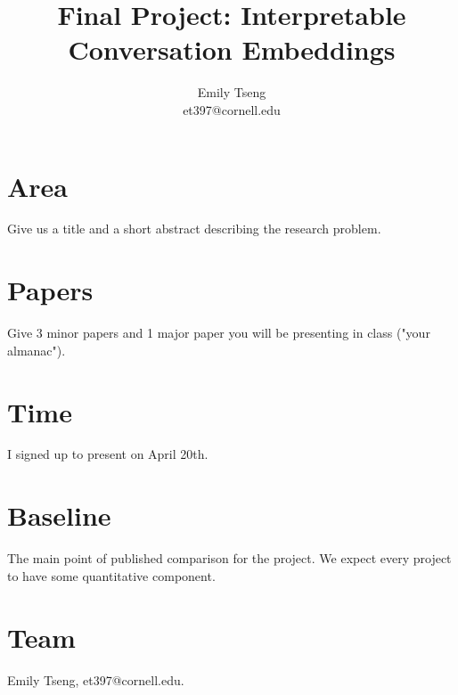 \documentclass[11pt]{article}
\title{Final Project: Interpretable Conversation Embeddings}
\author{Emily Tseng \\ et397@cornell.edu }
\begin{document}
\maketitle{}
\section{Area}

Give us a title and a short abstract describing the research problem.


\section{Papers}

Give 3 minor papers and 1 major paper you will be presenting in class ("your almanac").

\section{Time}

I signed up to present on April 20th.

\section{Baseline}

The main point of published comparison for the project. We expect every project to have some quantitative component.


\section{Team}

Emily Tseng, et397@cornell.edu.




\end{document}

